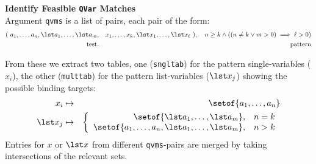 \textbf{Identify Feasible \texttt{QVar} Matches}\\
  Argument \texttt{qvms} is a list of pairs, each pair of the form:
  \begin{eqnarray*}
   (~a_1,\ldots,a_n, \lst a_1,\ldots,\lst a_m
   &,&
     x_1,\ldots,x_k, \lst x_1,\ldots,\lst x_\ell~),
     \quad n \geq k \land ((n \neq k \lor m > 0) \implies \ell > 0)
  \\ \mbox{test}  &,& \mbox{pattern}
  \end{eqnarray*}

  From these we extract two tables, one (\texttt{sngltab}) for the pattern
  single-variables ($x_i$), the other (\texttt{multtab}) for the pattern list-variables ($\lst x_j$)
  showing the possible binding targets:
  \begin{eqnarray*}
    x_i &\mapsto& \setof{a_1,\ldots,a_n}
  \\ \lst x_j &\mapsto&
    \left\{
      \begin{array}{rc}
        \setof{\lst a_1,\ldots,\lst a_m}, & n=k \\
        \setof{a_1,\ldots,a_n, \lst a_1,\ldots,\lst a_m}, & n > k
      \end{array}
    \right.
  \end{eqnarray*}
  Entries for $x$ or $\lst x$
  from different \texttt{qvms}-pairs
  are merged by taking intersections of the relevant sets.
